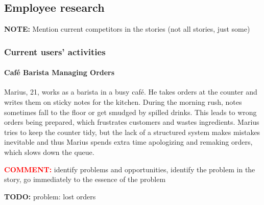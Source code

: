 \documentclass[]{VUMIFTemplateClass}
\newcommand{\yellowcomment}[1]{%
    \begin{tcolorbox}[colback=yellow!80, colframe=yellow!80, arc=0pt, outer arc=0pt, boxrule=0pt, left=3pt, right=3pt, top=3pt, bottom=3pt]
        \textbf{\textcolor{red}{COMMENT:}} #1
    \end{tcolorbox}
}
\newcommand{\noticecomment}[1]{%
    \begin{tcolorbox}[colback=blue!20, colframe=blue!60, arc=0pt, outer arc=0pt, boxrule=1pt, left=3pt, right=3pt, top=3pt, bottom=3pt]
        \textbf{\textcolor{blue!70!black}{NOTE:}} #1
    \end{tcolorbox}
}
\newcommand{\todocomment}[1]{%
    \begin{tcolorbox}[colback=red!20, colframe=red!60, arc=0pt, outer arc=0pt, boxrule=1pt, left=3pt, right=3pt, top=3pt, bottom=3pt]
        \textbf{\textcolor{orange!70!black}{TODO:}} #1
    \end{tcolorbox}
}
\newcommand{\subsubsubsection}[1]{\paragraph{#1}}
\begin{document}


\subsection{Employee research}
\noticecomment{Mention current competitors in the stories (not all stories, just some)}

\subsubsection{Current users' activities}

\subsubsubsection{Café Barista Managing Orders}

Marius, 21, works as a barista in a busy café. He takes orders at the counter
and writes them on sticky notes for the kitchen. During the morning rush, notes
sometimes fall to the floor or get smudged by spilled drinks. This leads to
wrong orders being prepared, which frustrates customers and wastes ingredients.
Marius tries to keep the counter tidy, but the lack of a structured system makes
mistakes inevitable and thus Marius spends extra time apologizing and remaking
orders, which slows down the queue.

\yellowcomment{identify problems and opportunities, identify the problem in the story, go immediately to the essence of the problem}

\todocomment{problem: lost orders}
\end{document}
